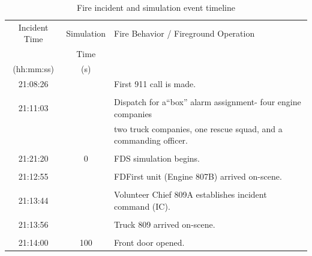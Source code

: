 \documentclass[12pt,oneside]{book}
\begin{document}
\begin{table}[!ht]
\caption[Fire incident and simulation event timeline]
{Fire incident and simulation event timeline}
\begin{tabular}{ccl}
\toprule
Incident Time  &  Simulation  &  Fire Behavior / Fireground Operation                                \\
               &  Time        &                                                                      \\
{(hh:mm:ss)}   &  {(s)}       &                                                                      \\
\midrule
21:08:26       &              &  First 911 call is made.                                             \\
               &              &                                                                      \\
21:11:03       &              &  Dispatch for a``box'' alarm assignment- four engine companies       \\
               &              &  two truck companies, one rescue squad, and a commanding officer.  \\
               &              &                                                                      \\
21:21:20       &  0           &  FDS simulation begins.                                              \\
               &              &                                                                      \\
21:12:55       &              &  FDFirst unit (Engine 807B) arrived on-scene.                        \\
               &              &                                                                      \\
21:13:44       &              &  Volunteer Chief 809A establishes incident command (IC).             \\
               &              &                                                                      \\
21:13:56       &              &  Truck 809 arrived on-scene.                                         \\
               &              &                                                                      \\
21:14:00       &  100         &  Front door opened.                                                  \\

\end{tabular}
\end{table}
\end{document}
